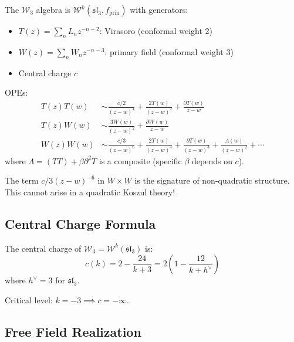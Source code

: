 \begin{definition}\label{def:w3-algebra}
The $\mathcal{W}_3$ algebra is $\mathcal{W}^k(\mathfrak{sl}_3, f_{\text{prin}})$ with generators:
\begin{itemize}
\item $T(z) = \sum_n L_n z^{-n-2}$: Virasoro (conformal weight 2)
\item $W(z) = \sum_n W_n z^{-n-3}$: primary field (conformal weight 3)
\item Central charge $c$
\end{itemize}

OPEs:
\begin{align}
T(z)T(w) &\sim \frac{c/2}{(z-w)^4} + \frac{2T(w)}{(z-w)^2} + \frac{\partial T(w)}{z-w} \\
T(z)W(w) &\sim \frac{3W(w)}{(z-w)^2} + \frac{\partial W(w)}{z-w} \\
W(z)W(w) &\sim \frac{c/3}{(z-w)^6} + \frac{2T(w)}{(z-w)^4} + \frac{\partial T(w)}{(z-w)^3} + \frac{\Lambda(w)}{(z-w)^2} + \cdots
\end{align}
where $\Lambda = (TT) + \beta \partial^2 T$ is a composite (specific $\beta$ depends on $c$).
\end{definition}

\begin{remark}
The term $c/3(z-w)^{-6}$ in $W \times W$ is the signature of non-quadratic structure. This cannot arise in a quadratic Koszul theory!
\end{remark}

\subsection{Central Charge Formula}

\begin{proposition}
The central charge of $\mathcal{W}_3 = \mathcal{W}^k(\mathfrak{sl}_3)$ is:
\begin{equation}
c(k) = 2 - \frac{24}{k+3} = 2\left(1 - \frac{12}{k+h^\vee}\right)
\end{equation}
where $h^\vee = 3$ for $\mathfrak{sl}_3$.

Critical level: $k = -3 \implies c = -\infty$.
\end{proposition}

\subsection{Free Field Realization}


